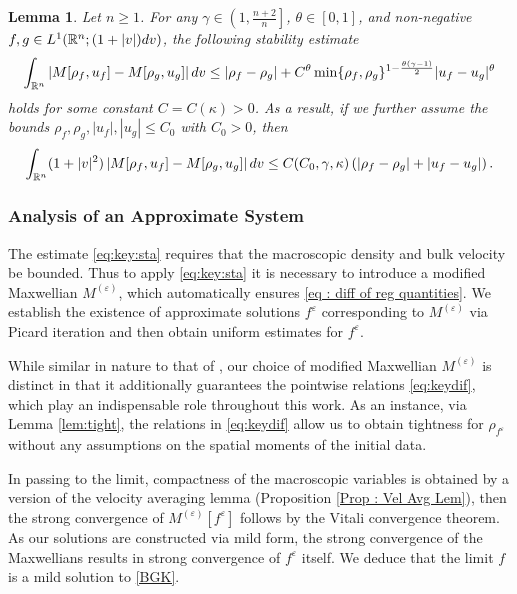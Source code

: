 \documentclass{amsart}
\theoremstyle{plain}
\newtheorem{lemma}[theorem]{Lemma}
\theoremstyle{remark}
\numberwithin{equation}{section}
\newcommand{\R}{\mathbb{R}}
\newcommand{\ve}{\varepsilon}
\newcommand{\dv}{\textnormal{d}v}
\newcommand{\lt}{\left}
\newcommand{\rt}{\right}
\newcommand{\intr}{\int_{\R^n}}
\begin{document}
\begin{lemma}
\label{thm : theta}
Let $n\ge1$. For any $\gamma \in \lt(1,\frac{n+2}{n}\rt]$, $\theta\in [0,1]$, and non-negative $f,g\in L^1(\R^n;(1+|v|)\dv)$, the following stability estimate
\begin{equation}\label{eq:M:sta}
\intr \lt|M[\rho_f,u_f]-M[\rho_g, u_g]\rt| \dv \le  |\rho_f -\rho_g | + C^\theta \min\{\rho_f,\rho_g\}^{1-\frac{\theta(\gamma-1)}{2}}|u_f - u_g|^\theta
\end{equation}
holds for some constant $C= C(\kappa)>0$. As a result, if we further assume the bounds $\rho_f, \rho_g, |u_f|, |u_g| \le C_0$ with $C_0>0$, then
\begin{equation}\label{eq:key:sta}
\intr (1+|v|^2)\lt|M[\rho_f, u_f]-M[\rho_g,u_g]\rt| \dv \le C(C_0,\gamma,\kappa)\lt( |\rho_f -\rho_g | +|u_f - u_g| \rt).
\end{equation}
\end{lemma}

\subsubsection{Analysis of an Approximate System} \label{sssec : app}
    
    \medskip
   
   The estimate \eqref{eq:key:sta} requires that the macroscopic density and bulk velocity be bounded. Thus to apply \eqref{eq:key:sta} it is necessary to introduce a modified Maxwellian $M^{(\ve)}$, which automatically ensures \eqref{eq : diff of reg quantities}. We establish the existence of approximate solutions $f^\ve$ corresponding to $M^{(\ve)}$ via Picard iteration and then obtain uniform estimates for $f^\ve$.
   
   While similar in nature to that of \cite{choihwang2024}, our choice of modified Maxwellian $M^{(\ve)}$ is distinct in that it additionally guarantees the pointwise relations \eqref{eq:keydif}, which play an indispensable role throughout this work. As an instance, via Lemma \ref{lem:tight}, the relations in \eqref{eq:keydif} allow us to obtain tightness for $\rho_{f^\ve}$ without any assumptions on the spatial moments of the initial data.
   
In passing to the limit, compactness of the macroscopic variables %
is obtained by a version of the velocity averaging lemma (Proposition \ref{Prop : Vel Avg Lem}), then the strong convergence of $M^{(\ve)}[f^\ve]$ follows by the Vitali convergence theorem.  As our solutions are constructed via mild form, the strong convergence of the Maxwellians results in strong convergence of $f^\ve$ itself. We deduce that the limit $f$ is a mild solution to \eqref{BGK}.
   
\end{document}
